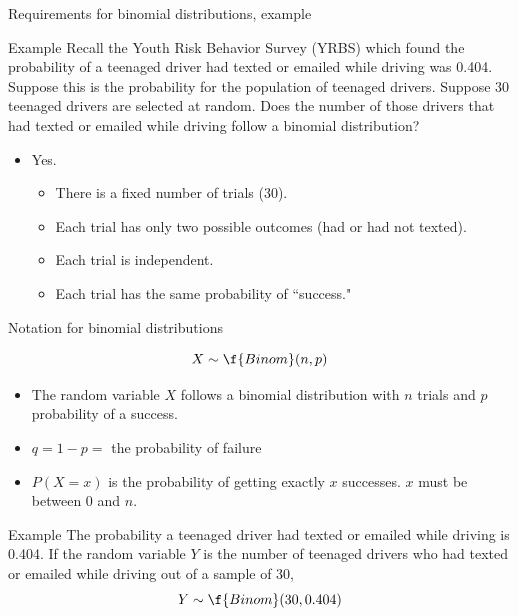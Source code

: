 \documentclass[xcolor=table, handout]{beamer}
\begin{document}
\begin{frame}{Requirements for binomial distributions, example}
\begin{exampleblock}{Example}
Recall the Youth Risk Behavior Survey (YRBS) which found the probability of a teenaged driver had texted or emailed while driving was 0.404. Suppose this is the probability for the population of teenaged drivers. Suppose 30 teenaged drivers are selected at random. Does the number of those drivers that had texted or emailed while driving follow a binomial distribution?
\begin{itemize}
\pause\item Yes. 
\begin{itemize}
\item There is a fixed number of trials (30).
\item Each trial has only two possible outcomes (had or had not texted).
\item Each trial is independent.
\item Each trial has the same probability of ``success."
\end{itemize}
\end{itemize}
\end{exampleblock}

\end{frame}


\begin{frame}{Notation for binomial distributions}
\begin{block}{}
\[X \sim \f{Binom}(n,p)\]
\begin{itemize}
\pause\item The random variable $X$ follows a binomial distribution with $n$ trials and $p$ probability of a success.
\pause\item $q = 1- p =$ the probability of failure
\pause\item $P(X=x)$ is the probability of getting exactly $x$ successes. $x$ must be between 0 and $n$.
\end{itemize}
\end{block}
\pause
\begin{exampleblock}{Example}
The probability a teenaged driver had texted or emailed while driving is 0.404. If the random variable $Y$ is the number of teenaged drivers who had texted or emailed while driving out of a sample of 30,
\[Y \sim \f{Binom}(30, 0.404)\]
\end{exampleblock}
\end{frame}
\end{document}
